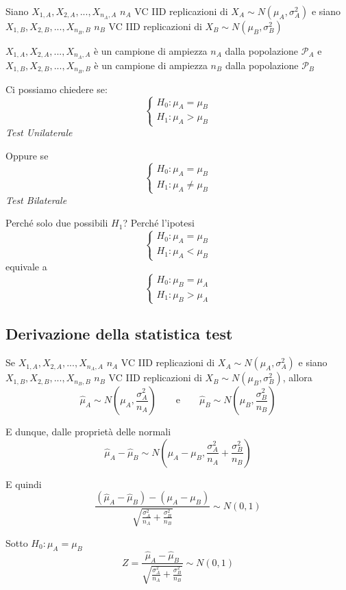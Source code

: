 \documentclass[
  11pt,
]{book}
\theoremstyle{mytheoremstyle}
\theoremstyle{mydefstyle}
\begin{document}
Siano \(X_{1,A},X_{2,A},...,X_{n_A,A}\) \(n_A\) VC IID replicazioni di \(X_A\sim N(\mu_A,\sigma_A^2)\) e siano \(X_{1,B},X_{2,B},...,X_{n_B,B}\) \(n_B\) VC IID replicazioni di \(X_B\sim N(\mu_B,\sigma_B^2)\)

\(X_{1,A},X_{2,A},...,X_{n_A,A}\) è un campione di ampiezza \(n_A\) dalla popolazione \(\mathscr{P}_A\) e \(X_{1,B},X_{2,B},...,X_{n_B,B}\) è un campione di ampiezza \(n_B\) dalla popolazione \(\mathscr{P}_B\)

Ci possiamo chiedere se:
\[\begin{cases}
H_0:\mu_A=\mu_B\\
H_1:\mu_A>\mu_B
\end{cases}\]
\emph{Test Unilaterale}

Oppure se
\[\begin{cases}
H_0:\mu_A=\mu_B\\
H_1:\mu_A\neq\mu_B
\end{cases}\]
\emph{Test Bilaterale}

Perché solo due possibili \(H_1\)? Perché l'ipotesi
\[\begin{cases}
H_0:\mu_A=\mu_B\\
H_1:\mu_A<\mu_B
\end{cases}\]
equivale a
\[\begin{cases}
H_0:\mu_B=\mu_A\\
H_1:\mu_B>\mu_A
\end{cases}\]

\subsection{Derivazione della statistica test}\label{derivazione-della-statistica-test}

Se \(X_{1,A},X_{2,A},...,X_{n_A,A}\) \(n_A\) VC IID replicazioni di \(X_A\sim N(\mu_A,\sigma_A^2)\) e siano \(X_{1,B},X_{2,B},...,X_{n_B,B}\) \(n_B\) VC IID replicazioni di \(X_B\sim N(\mu_B,\sigma_B^2)\), allora
\[\hat\mu_A\sim N\left(\mu_A,\frac {\sigma_A^2}{n_A}\right)\qquad\text{e}\qquad\hat\mu_B\sim N\left(\mu_B,\frac {\sigma_B^2}{n_B}\right)\]

E dunque, dalle proprietà delle normali
\[\hat\mu_A - \hat\mu_B\sim N\left(\mu_A-\mu_B,\frac{\sigma^2_A}{n_A}+\frac{\sigma^2_B}{n_B}\right)\]

E quindi
\[\frac{(\hat\mu_A - \hat\mu_B)-(\mu_A-\mu_B)}{\sqrt{\frac{\sigma^2_A}{n_A}+\frac{\sigma^2_B}{n_B}}}\sim N(0,1)\]

Sotto \(H_0:\mu_A=\mu_B\)
\[Z=\frac{\hat\mu_A - \hat\mu_B}{\sqrt{\frac{\sigma^2_A}{n_A}+\frac{\sigma^2_B}{n_B}}}\sim N(0,1)\]
\end{document}
